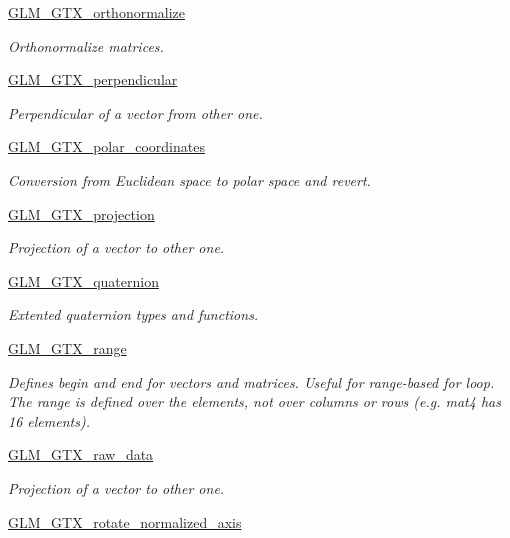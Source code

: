 \begin{DoxyCompactItemize}
\hyperlink{group__gtx__orthonormalize}{G\+L\+M\+\_\+\+G\+T\+X\+\_\+orthonormalize}
\begin{DoxyCompactList}\small\item\em Orthonormalize matrices. \end{DoxyCompactList}\item 
\hyperlink{group__gtx__perpendicular}{G\+L\+M\+\_\+\+G\+T\+X\+\_\+perpendicular}
\begin{DoxyCompactList}\small\item\em Perpendicular of a vector from other one. \end{DoxyCompactList}\item 
\hyperlink{group__gtx__polar__coordinates}{G\+L\+M\+\_\+\+G\+T\+X\+\_\+polar\+\_\+coordinates}
\begin{DoxyCompactList}\small\item\em Conversion from Euclidean space to polar space and revert. \end{DoxyCompactList}\item 
\hyperlink{group__gtx__projection}{G\+L\+M\+\_\+\+G\+T\+X\+\_\+projection}
\begin{DoxyCompactList}\small\item\em Projection of a vector to other one. \end{DoxyCompactList}\item 
\hyperlink{group__gtx__quaternion}{G\+L\+M\+\_\+\+G\+T\+X\+\_\+quaternion}
\begin{DoxyCompactList}\small\item\em Extented quaternion types and functions. \end{DoxyCompactList}\item 
\hyperlink{group__gtx__range}{G\+L\+M\+\_\+\+G\+T\+X\+\_\+range}
\begin{DoxyCompactList}\small\item\em Defines begin and end for vectors and matrices. Useful for range-\/based for loop. The range is defined over the elements, not over columns or rows (e.\+g. mat4 has 16 elements). \end{DoxyCompactList}\item 
\hyperlink{group__gtx__raw__data}{G\+L\+M\+\_\+\+G\+T\+X\+\_\+raw\+\_\+data}
\begin{DoxyCompactList}\small\item\em Projection of a vector to other one. \end{DoxyCompactList}\item 
\hyperlink{group__gtx__rotate__normalized__axis}{G\+L\+M\+\_\+\+G\+T\+X\+\_\+rotate\+\_\+normalized\+\_\+axis}

\end{DoxyCompactItemize}
